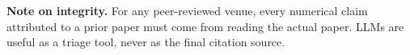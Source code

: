 \documentclass[11pt,a4paper]{article}
\begin{document}
\begin{tcolorbox}[colback=accent!8,colframe=accent,sharp corners,
boxrule=0.6pt,left=8pt,right=8pt,top=6pt,bottom=6pt]
\textbf{Note on integrity.} For any peer-reviewed venue, every numerical
claim attributed to a prior paper must come from reading the actual paper.
LLMs are useful as a triage tool, never as the final citation source.
\end{tcolorbox}
\end{document}
